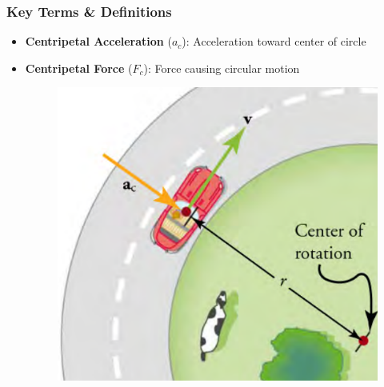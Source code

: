 \documentclass{beamer}
\begin{document}
\begin{frame}
\frametitle{Key Terms \& Definitions}
\begin{itemize}
        \item \textbf{Centripetal Acceleration} ($a_c$): Acceleration toward center of circle
    \item \textbf{Centripetal Force} ($F_c$): Force causing circular motion
\begin{figure}
    \centering
    \includegraphics[width=0.7\linewidth]{CH6/Screenshot 2024-11-21 130344.png}
\end{figure}
    
\end{itemize}
\end{frame}
\end{document}
